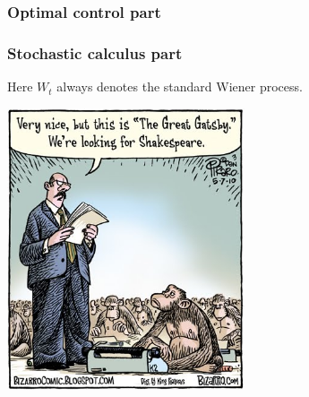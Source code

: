 \documentclass[pdftex,12pt,a4paper]{article}
\begin{document}
\subsubsection*{Optimal control part}


\subsubsection*{Stochastic calculus part}

Here $W_t$ always denotes the standard Wiener process. 

\vspace{10pt}

\begin{center}
\includegraphics[width=7cm]{gatsby}
\end{center}

\vspace{10pt}
\end{document}

